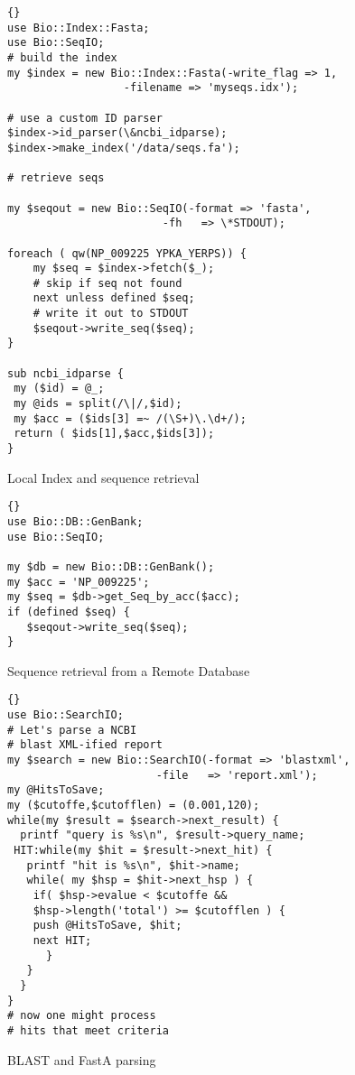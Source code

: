 \documentclass[12pt]{article}
\begin{document}

\begin{figure}[p]

\begin{scriptsize}
\begin{lstlisting}{}
use Bio::Index::Fasta;
use Bio::SeqIO;
# build the index
my $index = new Bio::Index::Fasta(-write_flag => 1,
				  -filename => 'myseqs.idx');

# use a custom ID parser
$index->id_parser(\&ncbi_idparse); 
$index->make_index('/data/seqs.fa');

# retrieve seqs

my $seqout = new Bio::SeqIO(-format => 'fasta',
	                    -fh   => \*STDOUT);

foreach ( qw(NP_009225 YPKA_YERPS)) {
    my $seq = $index->fetch($_);
    # skip if seq not found
    next unless defined $seq; 
    # write it out to STDOUT
    $seqout->write_seq($seq); 
}

sub ncbi_idparse { 
 my ($id) = @_;
 my @ids = split(/\|/,$id);
 my $acc = ($ids[3] =~ /(\S+)\.\d+/);	
 return ( $ids[1],$acc,$ids[3]);	
}
\end{lstlisting}
\end{scriptsize}
\label{example1}
\caption{Local Index and sequence retrieval}
\end{figure}

\begin{figure}[p]
\begin{scriptsize}
\begin{lstlisting}{}
use Bio::DB::GenBank;
use Bio::SeqIO;

my $db = new Bio::DB::GenBank();
my $acc = 'NP_009225';
my $seq = $db->get_Seq_by_acc($acc);
if (defined $seq) {
   $seqout->write_seq($seq);
}
\end{lstlisting}
\end{scriptsize}
\caption{Sequence retrieval from a Remote Database}
\label{example2}
\end{figure}

\begin{figure}[p]

\begin{scriptsize}
\begin{lstlisting}{}
use Bio::SearchIO;
# Let's parse a NCBI 
# blast XML-ified report  
my $search = new Bio::SearchIO(-format => 'blastxml',
          		       -file   => 'report.xml');
my @HitsToSave;
my ($cutoffe,$cutofflen) = (0.001,120);
while(my $result = $search->next_result) {
  printf "query is %s\n", $result->query_name;
 HIT:while(my $hit = $result->next_hit) {
   printf "hit is %s\n", $hit->name;
   while( my $hsp = $hit->next_hsp ) {
    if( $hsp->evalue < $cutoffe && 
	$hsp->length('total') >= $cutofflen ) { 
	push @HitsToSave, $hit;
	next HIT;
      } 
   }
  }
}
# now one might process 
# hits that meet criteria

\end{lstlisting}
\end{scriptsize}
\caption{BLAST \cite{blast} and FastA \cite{fasta} parsing}
\label{example3}
\end{figure}
\end{document}
